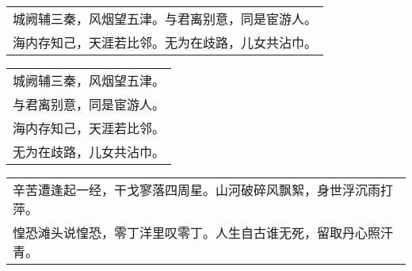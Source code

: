 \nopagebreak%
\nopagebreak%
\noindent\begin{minipage}{\linewidth}
  \vskip-3pt\begin{table}[H]
    \centering
    \begin{tabular}{@{}l@{}}
城阙辅三秦，风烟望五津。与君离别意，同是宦游人。\\
海内存知己，天涯若比邻。无为在歧路，儿女共沾巾。
    \end{tabular}
  \end{table}
\end{minipage}
\vspace{1cm}


\nopagebreak%
\nopagebreak%
\noindent\begin{minipage}{\linewidth}
  \vskip-3pt\begin{table}[H]
    \centering
    \begin{tabular}{@{}l@{}}
城阙辅三秦，风烟望五津。\\
与君离别意，同是宦游人。\\
海内存知己，天涯若比邻。\\
无为在歧路，儿女共沾巾。
    \end{tabular}
  \end{table}
\end{minipage}
\vspace{1cm}


\nopagebreak%
\nopagebreak%
\noindent\begin{minipage}{\linewidth}
  \vskip-3pt\begin{table}[H]
    \centering
    \begin{tabular}{@{}l@{}}
辛苦遭逢起一经，干戈寥落四周星。山河破碎风飘絮，身世浮沉雨打萍。\\
惶恐滩头说惶恐，零丁洋里叹零丁。人生自古谁无死，留取丹心照汗青。
    \end{tabular}
  \end{table}
\end{minipage}
\vspace{1cm}


